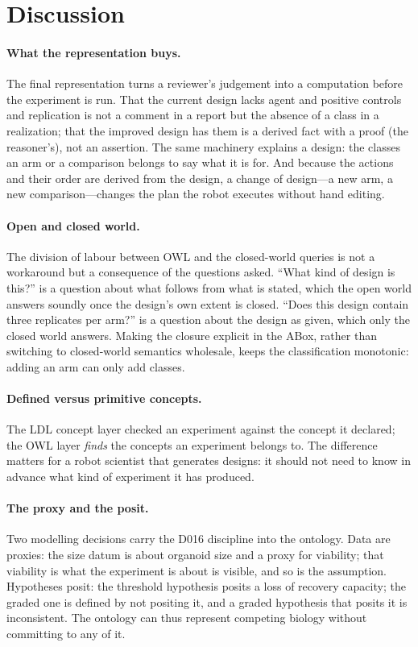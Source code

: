 \documentclass[10pt,a4paper]{article}
\begin{document}
\section{Discussion}\label{sec:discussion}
\paragraph{What the representation buys.} The final representation turns a reviewer's judgement into a computation
before the experiment is run. That the current design lacks agent and positive controls and replication is not a
comment in a report but the absence of a class in a realization; that the improved design has them is a derived fact
with a proof (the reasoner's), not an assertion. The same machinery explains a design: the classes an arm or a
comparison belongs to say what it is for. And because the actions and their order are derived from the design, a
change of design---a new arm, a new comparison---changes the plan the robot executes without hand editing.

\paragraph{Open and closed world.} The division of labour between OWL and the closed-world queries is not a
workaround but a consequence of the questions asked. ``What kind of design is this?'' is a question about what follows
from what is stated, which the open world answers soundly once the design's own extent is closed. ``Does this design
contain three replicates per arm?'' is a question about the design as given, which only the closed world answers.
Making the closure explicit in the ABox, rather than switching to closed-world semantics wholesale, keeps the
classification monotonic: adding an arm can only add classes.

\paragraph{Defined versus primitive concepts.} The LDL concept layer checked an experiment against the concept it
declared; the OWL layer \emph{finds} the concepts an experiment belongs to. The difference matters for a robot
scientist that generates designs: it should not need to know in advance what kind of experiment it has produced.

\paragraph{The proxy and the posit.} Two modelling decisions carry the D016 discipline into the ontology. Data are
proxies: the size datum is about organoid size and a proxy for viability; that viability is what the experiment is
about is visible, and so is the assumption. Hypotheses posit: the threshold hypothesis posits a loss of recovery
capacity; the graded one is defined by not positing it, and a graded hypothesis that posits it is inconsistent. The
ontology can thus represent competing biology without committing to any of it.
\end{document}
